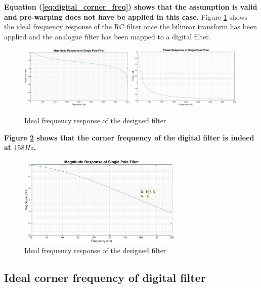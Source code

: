 \documentclass{article}
\begin{document}
\textbf{Equation (\ref{eq:digital_corner_freq}) shows that the assumption is valid and pre-warping does not have be applied in this case.} Figure \ref{fig:RC_ideal} shows the ideal frequency response of the RC filter once the bilinear transform has been applied and the analogue filter has been mapped to a digital filter.

\begin{figure}[H]
    \centering
    \includegraphics[width = 0.49\textwidth]{mag_response_ideal}
    \includegraphics[width = 0.49\textwidth]{phase_response_ideal}
    \caption{Ideal frequency response of the designed filter}
    \label{fig:RC_ideal}
\end{figure}

\textbf{Figure \ref{fig:RC_corner_ideal} shows that the corner frequency of the digital filter is indeed at $158Hz$.}

\begin{figure}[H]
    \centering
    \includegraphics[width = 0.70\textwidth]{time_constant_ideal}
    \caption{Ideal frequency response of the designed filter}
    \label{fig:RC_corner_ideal}
\end{figure}

\newpage
\subsection{Ideal corner frequency of digital filter}
\end{document}
